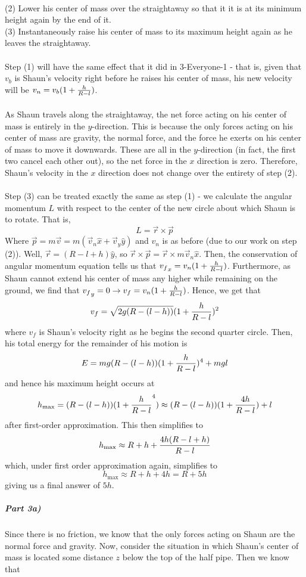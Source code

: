 \\ (2) Lower his center of mass over the straightaway so that it it is at its minimum height again by the end of it.
\\ (3) Instantaneously raise his center of mass to its maximum height again as he leaves the straightaway.
\\\\ Step (1) will have the same effect that it did in 3-Everyone-1 - that is, given that $v_b$ is Shaun's velocity right before he raises his center of mass, his new velocity will be $v_n=v_b (1+\frac{h}{R-l})$.  
\\\\ As Shaun travels along the straightaway, the net force acting on his center of mass is entirely in the $y$-direction.  This is because the only forces acting on his center of mass are gravity, the normal force, and the force he exerts on his center of mass to move it downwards.  These are all in the $y$-direction (in fact, the first two cancel each other out), so the net force in the $x$ direction is zero.  Therefore, Shaun's velocity in the $x$ direction does not change over the entirety of step (2).  
\\\\ Step (3) can be treated exactly the same as step (1) - we calculate the angular momentum $L$ with respect to the center of the new circle about which Shaun is to rotate.  That is, 
$$L=\vec r\times \vec p$$
Where $\vec p=m\vec v=m(\vec v_n \hat x+\vec v_y \hat y)$ and $v_n$ is as before (due to our work on step (2)).  Well, $\vec r=(R-l+h)\hat y$, so $\vec r\times \vec p=\vec r\times m\vec v_n \hat x$.  Then, the conservation of angular momentum equation tells us that ${v_f}_x=v_n (1+\frac{h}{R-l})$.  Furthermore, as Shaun cannot extend his center of mass any higher while remaining on the ground, we find that ${v_f}_y=0\rightarrow v_f=v_n(1+\frac{h}{R-l})$.  Hence, we get that
$$v_f=\sqrt{2g(R-(l-h))}(1+\frac{h}{R-l})^2$$
where $v_f$ is Shaun's velocity right as he begins the second quarter circle.  Then, his total energy for the remainder of his motion is
$$E=mg(R-(l-h)) (1+\frac{h}{R-l})^4+mgl$$
and hence his maximum height occurs at
$$h_{\max}=(R-(l-h))(1+\frac{h}{R-l}^4)\approx (R-(l-h))(1+\frac{4h}{R-l})+l$$
after first-order approximation.  This then simplifies to
$$h_{\max}\approx R+h+\frac{4h(R-l+h)}{R-l}$$
which, under first order approximation again, simplifies to
$$h_{\max}\approx R+h+4h=R+5h$$
giving us a final answer of $5h$.
\subparagraph{Part 3a)}
Since there is no friction, we know that the only forces acting on Shaun are the normal force and gravity. Now, consider the situation in which Shaun's center of mass is located some distance $z$ below the top of the half pipe. Then we know that
